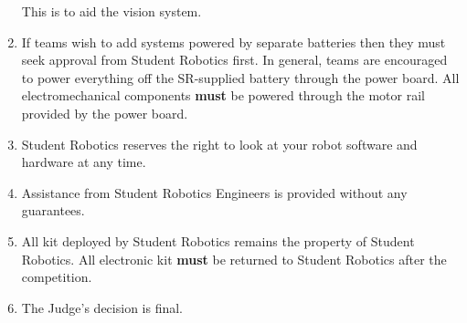 \begin{enumerate}
 This is to aid the vision system.
\item If teams wish to add systems powered by separate batteries then they must seek approval from Student Robotics first.
 In general, teams are encouraged to power everything off the SR-supplied battery through the power board.
 All electromechanical components \textbf{must} be powered through the motor rail provided by the power board.
\item Student Robotics reserves the right to look at your robot software and hardware at any time.
\item Assistance from Student Robotics Engineers is provided without any guarantees.
\item All kit deployed by Student Robotics remains the property of Student Robotics. All electronic kit \textbf{must} be returned to Student Robotics after the competition.
\item The Judge's decision is final.


\end{enumerate}
